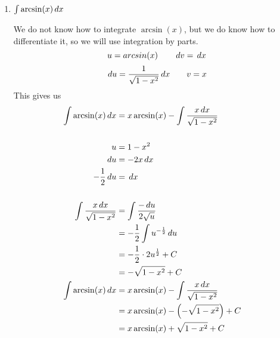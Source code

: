\documentclass[noinstructornotes]{ximera}
\begin{document}
\begin{problem}
\begin{enumerate}
	\item $\int \arcsin(x) \,d x$
	\begin{freeResponse}
	We do not know how to integrate $\arcsin(x)$, but we do know how to differentiate it, so we will use integration by parts. 
		{\color{red}
		\[
		u = arcsin(x)	\qquad	\,d v =  \,d x
		\]
		\[
		\,d u = \frac{1}{\sqrt{1-x^2}} \,d x	\qquad	v = x
		\]}
	This gives us
	\begin{align*}
	\int \arcsin(x) \,d x &= x\arcsin(x) - \int \frac{x \,d x}{\sqrt{1-x^2}} \\
	& \\
	u &= 1-x^2 \\
	\,d u &= -2x \,d x \\
	-\frac{1}{2}\,d u &= \,d x \\
	& \\
	\int \frac{x \,d x}{\sqrt{1-x^2}} &= \int \frac{-\,d u}{2\sqrt{u}}\\
	&= -\frac{1}{2} \int u^{-\frac{1}{2}} \,d u \\
	&= -\frac{1}{2} \cdot 2u^{\frac{1}{2}} +C \\
	&= - \sqrt{1-x^2} +C
	& \\
	\int \arcsin(x) \,d x &= x\arcsin(x) - \int \frac{x \,d x}{\sqrt{1-x^2}} \\
	&=x\arcsin(x) - \left(  - \sqrt{1-x^2} \right) +C \\
	&=x\arcsin(x) + \sqrt{1-x^2} +C 
	\end{align*}
	
	\end{freeResponse}
	

\end{enumerate}
\end{problem}
\end{document}
